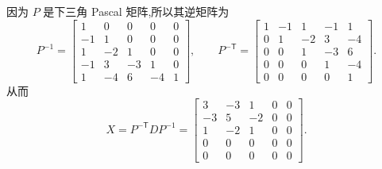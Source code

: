 \begin{problem}
\begin{solution}
    因为 $P$ 是下三角 Pascal 矩阵,所以其逆矩阵为
    \[
        P^{-1}=
        \begin{bmatrix}
            1 & 0 & 0 & 0 & 0 \\
            -1 & 1 & 0 & 0 & 0 \\
            1 & -2 & 1 & 0 & 0 \\
            -1 & 3 & -3 & 1 & 0 \\
            1 & -4 & 6 & -4 & 1
        \end{bmatrix},
        \qquad
        P^{-\mathsf T}=
        \begin{bmatrix}
            1 & -1 & 1 & -1 & 1 \\
            0 & 1 & -2 & 3 & -4 \\
            0 & 0 & 1 & -3 & 6 \\
            0 & 0 & 0 & 1 & -4 \\
            0 & 0 & 0 & 0 & 1
        \end{bmatrix}.
    \]
    从而
    \[
        X=P^{-\mathsf T}DP^{-1}
        =
        \begin{bmatrix}
            3 & -3 & 1 & 0 & 0 \\
            -3 & 5 & -2 & 0 & 0 \\
            1 & -2 & 1 & 0 & 0 \\
            0 & 0 & 0 & 0 & 0 \\
            0 & 0 & 0 & 0 & 0
        \end{bmatrix}.
    \]
\end{solution}
\end{problem}


